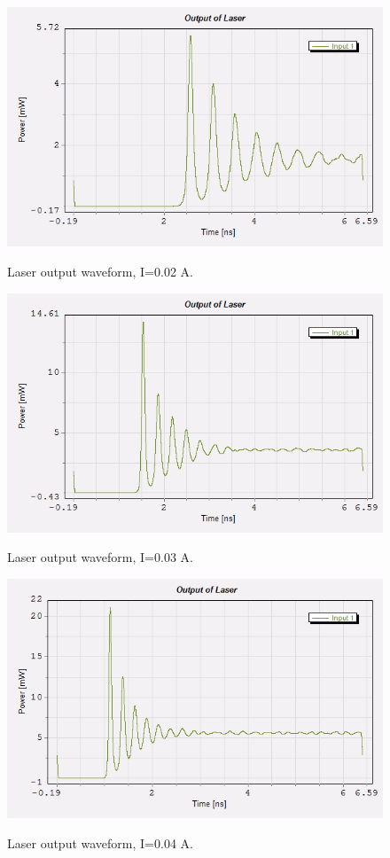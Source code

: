 \documentclass[a4paper,10pt]{report}
\begin{document}
\begin{figure}[!ht]
  \centering
  \includegraphics[width=12cm]{5_6.png}\\
  \caption{Laser output waveform, I=0.02 A.}
  \label{5_3}
\end{figure}

\begin{figure}[!ht]
  \centering
  \includegraphics[width=12cm]{5_8.png}\\
  \caption{Laser output waveform, I=0.03 A.}
  \label{5_4}
\end{figure}

\begin{figure}[!ht]
  \centering
  \includegraphics[width=12cm]{5_10.png}\\
  \caption{Laser output waveform, I=0.04 A.}
  \label{5_5}
\end{figure}
\end{document}
